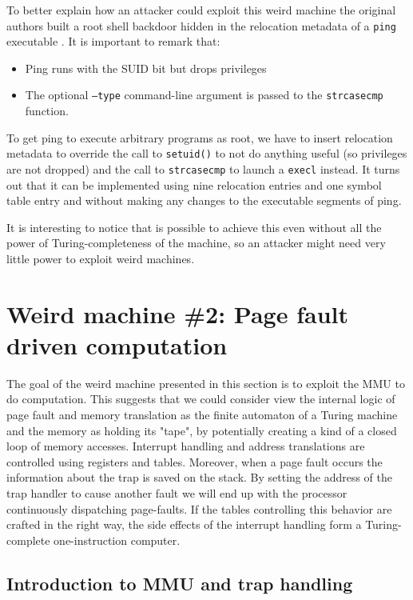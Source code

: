 \documentclass[11pt,twoside,a4paper]{article}
\begin{document}
To better explain how an attacker could exploit this weird machine the original authors built a root shell backdoor hidden in the relocation metadata of a \texttt{ping} executable \cite{ping_elf}. It is important to remark that: 
\begin{itemize}
\item Ping runs with the SUID bit but drops privileges 
\item The optional \texttt{--type} command-line argument is passed to the \texttt{strcasecmp} function.
\end{itemize}

To get ping to execute arbitrary programs as root, we have to insert relocation metadata to override the call to \texttt{setuid()} to not do anything useful (so privileges are not dropped) and the call to \texttt{strcasecmp} to launch a \texttt{execl} instead. It turns out that it can be implemented using nine relocation entries and one symbol table entry and without making any changes to the executable segments of ping.

It is interesting to notice that is possible to achieve this even without all the power of Turing-completeness of the machine, so an attacker might need very little power to exploit weird machines.

\section{Weird machine \#2: Page fault driven computation}
The goal of the weird machine presented in this section is to exploit the MMU to do computation. This suggests that we could consider view the internal logic of page fault and memory translation as the finite automaton of a Turing machine and the memory as holding its "tape", by potentially creating a kind of a closed loop of memory accesses.
Interrupt handling and address translations are controlled using registers and tables. Moreover, when a page fault occurs the information about the trap is saved on the stack. By setting the address of the trap handler to cause another fault we will end up with the processor continuously dispatching page-faults. If the tables controlling this behavior are crafted in the right way, the side effects of the interrupt handling form a Turing-complete one-instruction computer.

\subsection{Introduction to MMU and trap handling}
\end{document}
